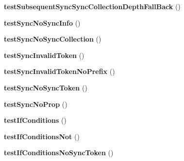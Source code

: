 \begin{DoxyCompactItemize}
{\bfseries test\+Subsequent\+Sync\+Sync\+Collection\+Depth\+Fall\+Back} ()
\item 
\mbox{\label{class_sabre_1_1_d_a_v_1_1_sync_1_1_plugin_test_a1a7ff7d4bbb6a7b09c581f70c4a43967}} 
{\bfseries test\+Sync\+No\+Sync\+Info} ()
\item 
\mbox{\label{class_sabre_1_1_d_a_v_1_1_sync_1_1_plugin_test_ad104fc178d942c443a53628dda38a0d7}} 
{\bfseries test\+Sync\+No\+Sync\+Collection} ()
\item 
\mbox{\label{class_sabre_1_1_d_a_v_1_1_sync_1_1_plugin_test_a1fa2a7199a540fa70f473935cf40baf3}} 
{\bfseries test\+Sync\+Invalid\+Token} ()
\item 
\mbox{\label{class_sabre_1_1_d_a_v_1_1_sync_1_1_plugin_test_ab5cbe360279646d1acb047257232d317}} 
{\bfseries test\+Sync\+Invalid\+Token\+No\+Prefix} ()
\item 
\mbox{\label{class_sabre_1_1_d_a_v_1_1_sync_1_1_plugin_test_a1876913dd09a94cf22f939fe0b5a1a0c}} 
{\bfseries test\+Sync\+No\+Sync\+Token} ()
\item 
\mbox{\label{class_sabre_1_1_d_a_v_1_1_sync_1_1_plugin_test_a82558dd42fcff7f8fe15dd9b61ba48d1}} 
{\bfseries test\+Sync\+No\+Prop} ()
\item 
\mbox{\label{class_sabre_1_1_d_a_v_1_1_sync_1_1_plugin_test_ad51567f52b322df03251d01a13979b74}} 
{\bfseries test\+If\+Conditions} ()
\item 
\mbox{\label{class_sabre_1_1_d_a_v_1_1_sync_1_1_plugin_test_a1d0685274358b623ed874d930c355821}} 
{\bfseries test\+If\+Conditions\+Not} ()
\item 
\mbox{\label{class_sabre_1_1_d_a_v_1_1_sync_1_1_plugin_test_aae4da60257eeef740d40b124d593aa13}} 
{\bfseries test\+If\+Conditions\+No\+Sync\+Token} ()
\end{DoxyCompactItemize}
